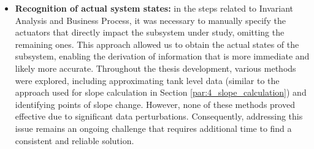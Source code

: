 \begin{itemize}
	\item \textbf{Recognition of actual system states:} in the steps related to Invariant Analysis and Business Process, it was necessary to manually specify the actuators that directly impact the subsystem under study, omitting the remaining ones. This approach allowed us to obtain the actual states of the subsystem, enabling the derivation of information that is more immediate and likely more accurate. Throughout the thesis development, various methods were explored, including approximating tank level data (similar to the approach used for slope calculation in Section \ref{par:4_slope_calculation}) and identifying points of slope change. However, none of these methods proved effective due to significant data perturbations. Consequently, addressing this issue remains an ongoing challenge that requires additional time to find a consistent and reliable solution.
\end{itemize}

\vfill
\nolinenumbers